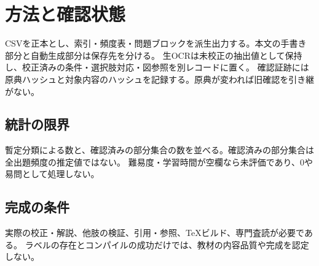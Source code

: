 \chapter{方法と確認状態}
CSVを正本とし、索引・頻度表・問題ブロックを派生出力する。本文の手書き部分と自動生成部分は保存先を分ける。
生OCRは未校正の抽出値として保持し、校正済みの条件・選択肢対応・図参照を別レコードに置く。
確認証跡には原典ハッシュと対象内容のハッシュを記録する。原典が変われば旧確認を引き継がない。
\section{統計の限界}
暫定分類による数と、確認済みの部分集合の数を並べる。確認済みの部分集合は全出題頻度の推定値ではない。
難易度・学習時間が空欄なら未評価であり、0や易問として処理しない。
\section{完成の条件}
実際の校正・解説、他肢の検証、引用・参照、TeXビルド、専門査読が必要である。
ラベルの存在とコンパイルの成功だけでは、教材の内容品質や完成を認定しない。
